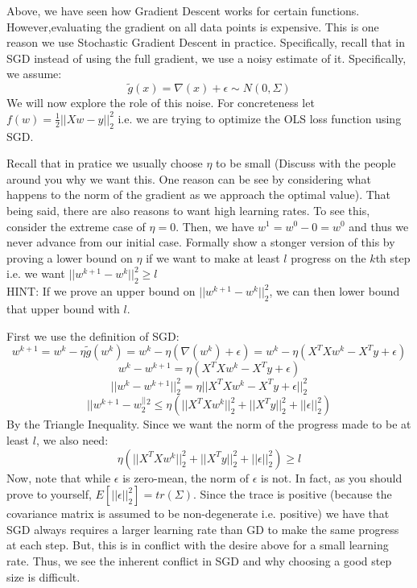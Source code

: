 \begin{Parts}
\begin{solution}
\end{solution}

\Part
     Above, we have seen how Gradient Descent works for certain functions. However,evaluating the gradient on all data points is expensive. This is one reason we use Stochastic Gradient Descent in practice. Specifically, recall that in SGD instead of using the full gradient, we use a noisy estimate of it. Specifically, we assume:
         $$\tilde{g}(x) = \nabla(x) + \epsilon \sim N(0, \Sigma)$$
     We will now explore the role of this noise.
For concreteness let $f(w) = \frac{1}{2}||Xw - y||_2^2$ i.e. we are trying to optimize the OLS loss function using SGD.

Recall that in pratice we usually choose $\eta$ to be small (Discuss with the people around you why we want this. One reason can be see by considering what happens to the norm of the gradient as we approach the optimal value). That being said, there are also reasons to want high learning rates. To see this, consider the extreme case of $\eta = 0$. Then, we have $w^1 = w^0 - 0 = w^0$ and thus we never advance from our initial case. Formally show a stonger version of this by proving a lower bound on $\eta$ if we want to make at least $l$ progress on the $k$th step i.e. we want $||w^{k+1} - w^k||_2^2 \geq l$ \\
    HINT: If we prove an upper bound on $||w^{k+1} - w^k||_2^2$, we can then lower bound that upper bound with $l$. \\
\begin{solution} 
      First we use the definition of SGD:
  $$w^{k+1} = w^k - \eta \tilde{g}(w^k) = w^k - \eta(\nabla(w^k) + \epsilon) = w^k - \eta(X^TXw^k - X^Ty + \epsilon)$$
  $$w^k - w^{k+1} = \eta(X^TXw^k - X^Ty + \epsilon)$$
  $$||w^k - w^{k+1}||_2^2 = \eta||X^TXw^k - X^Ty + \epsilon||_2^2$$
  $$||w^{k+1} - w^||_2^2 \leq \eta(||X^TXw^k||_2^2 + ||X^Ty||_2^2 + ||\epsilon||_2^2)$$
  By the Triangle Inequality. Since we want the norm of the progress made to be at least $l$, we also need:
  $$\eta(||X^TXw^k||_2^2 + ||X^Ty||_2^2 + ||\epsilon||_2^2) \geq l$$
  Now, note that while $\epsilon$ is zero-mean, the norm of $\epsilon$ is not. In fact, as you should prove to yourself, $E[||\epsilon||_2^2] = tr(\Sigma)$. Since the trace is positive (because the covariance matrix is assumed to be non-degenerate i.e. positive) we have that SGD always requires a larger learning rate than GD to make the same progress at each step. But, this is in conflict with the desire above for a small learning rate. Thus, we see the inherent conflict in SGD and why choosing a good step size is difficult.
\end{solution}
\end{Parts}

